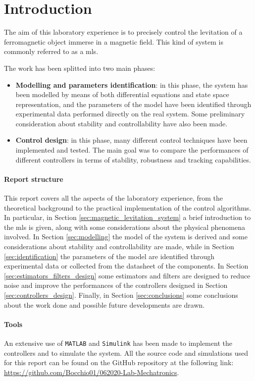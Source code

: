 \section{Introduction}
\label{sec:introduction}

The aim of this laboratory experience is to precisely control the levitation of a ferromagnetic object immerse in a magnetic field.
This kind of system is commonly referred to as a \acrfull{mls}.

The work has been splitted into two main phases:

\begin{itemize}
    \item \textbf{Modelling and parameters identification}: in this phase, the system has been modelled by means of both differential equations and state space representation, and the parameters of the model have been identified through experimental data performed directly on the real system. Some preliminary consideration about stability and controllability have also been made.
    \item \textbf{Control design}: in this phase, many different control techniques have been implemented and tested. The main goal was to compare the performances of different controllers in terms of stability, robustness and tracking capabilities.
\end{itemize}

\paragraph{Report structure}

This report covers all the aspects of the laboratory experience, from the theoretical background to the practical implementation of the control algorithms.
In particular, in Section \ref{sec:magnetic_levitation_system} a brief introduction to the \acrshort{mls} is given, along with some considerations about the physical phenomena involved.
In Section \ref{sec:modelling} the model of the system is derived and some considerations about stability and controllability are made, while in Section \ref{sec:identification} the parameters of the model are identified through experimental data or collected from the datasheet of the components.
In Section \ref{sec:estimators_filters_design} some estimators and filters are designed to reduce noise and improve the performances of the controllers designed in Section \ref{sec:controllers_design}.
Finally, in Section \ref{sec:conclusions} some conclusions about the work done and possible future developments are drawn.

\paragraph{Tools}

An extensive use of \texttt{MATLAB} and \texttt{Simulink} has been made to implement the controllers and to simulate the system.
All the source code and simulations used for this report can be found on the GitHub repository at the following link: \url{https://github.com/Bocchio01/062020-Lab-Mechatronics}.